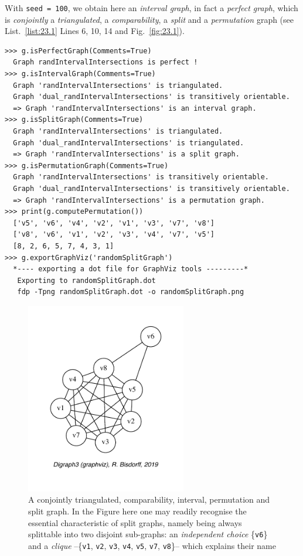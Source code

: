 With \texttt{seed = 100}, we obtain here an \emph{interval graph}, in fact a \emph{perfect graph}, which is \emph{conjointly} a \emph{triangulated}, a \emph{comparability}, a \emph{split} and a \emph{permutation} graph (see List.~\vref{list:23.1} Lines 6, 10, 14 and Fig.~\vref{fig:23.1}).
\begin{lstlisting}[caption={Testing perfect graph categories.},label=list:23.1,basicstyle=\ttfamily\scriptsize]
>>> g.isPerfectGraph(Comments=True)
  Graph randIntervalIntersections is perfect !
>>> g.isIntervalGraph(Comments=True)
  Graph 'randIntervalIntersections' is triangulated.
  Graph 'dual_randIntervalIntersections' is transitively orientable.
  => Graph 'randIntervalIntersections' is an interval graph.
>>> g.isSplitGraph(Comments=True)
  Graph 'randIntervalIntersections' is triangulated.
  Graph 'dual_randIntervalIntersections' is triangulated.
  => Graph 'randIntervalIntersections' is a split graph.
>>> g.isPermutationGraph(Comments=True)
  Graph 'randIntervalIntersections' is transitively orientable.
  Graph 'dual_randIntervalIntersections' is transitively orientable.
  => Graph 'randIntervalIntersections' is a permutation graph.
>>> print(g.computePermutation())
  ['v5', 'v6', 'v4', 'v2', 'v1', 'v3', 'v7', 'v8']
  ['v8', 'v6', 'v1', 'v2', 'v3', 'v4', 'v7', 'v5']
  [8, 2, 6, 5, 7, 4, 3, 1]
>>> g.exportGraphViz('randomSplitGraph')
  *---- exporting a dot file for GraphViz tools ---------*
   Exporting to randomSplitGraph.dot
   fdp -Tpng randomSplitGraph.dot -o randomSplitGraph.png
\end{lstlisting}
\begin{figure}[ht]
\sidecaption[t]
\includegraphics[width=7cm]{Figures/23-1-randomSplitGraph.pdf}
\caption[A conjointly triangulated, comparability, interval, permutation and split graph]{A conjointly triangulated, comparability, interval, permutation and split graph. In the Figure here one may readily recognise the essential characteristic of split graphs, namely being always splittable into two disjoint sub-graphs: an \emph{independent choice} \{\texttt{v6}\} and a \emph{clique}  --\{\texttt{v1}, \texttt{v2}, \texttt{v3}, \texttt{v4}, \texttt{v5}, \texttt{v7}, \texttt{v8}\}-- which explains their name} 
\label{fig:23.1}       %
\end{figure}
